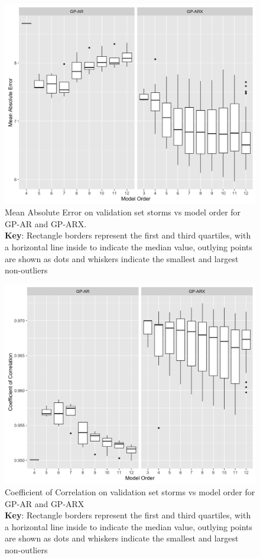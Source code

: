 \documentclass[sw, draft]{AGUTeX}
\begin{document}
\begin{figure}
\noindent\includegraphics[width=\textwidth]{Compare-mae.png}
\caption{Mean Absolute Error on validation set storms vs model order for GP-AR and GP-ARX. \\ \textbf{Key}: Rectangle borders represent the first and third quartiles, with a horizontal line inside to indicate the median value, outlying points are shown as dots and whiskers indicate the smallest and largest non-outliers}
\label{fig:CompareMae}
\end{figure}

\begin{figure}
\noindent\includegraphics[width=\textwidth]{Compare-cc.png}
\caption{Coefficient of Correlation on validation set storms vs model order for GP-AR and GP-ARX \\ \textbf{Key}: Rectangle borders represent the first and third quartiles, with a horizontal line inside to indicate the median value, outlying points are shown as dots and whiskers indicate the smallest and largest non-outliers}
\label{fig:CompareCC}
\end{figure}
\end{document}
